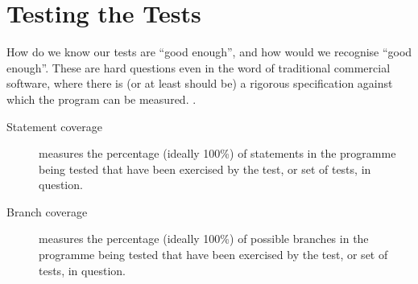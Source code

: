 \section{Testing the Tests}
How do we know our tests are ``good enough'', and how would we recognise ``good enough''. These are hard questions even in the word of traditional commercial software, where there is (or at least should be) a rigorous specification against which the program can be measured. \cite{Zhuetal1997}.
\begin{description}
\item[Statement coverage]measures the percentage (ideally 100\%) of statements in the programme being tested that have been exercised by the test, or set of tests, in question.
\item[Branch coverage]measures the percentage (ideally 100\%) of possible branches  in the programme being tested that have been exercised by the test, or set of tests, in question.
\end{description}
